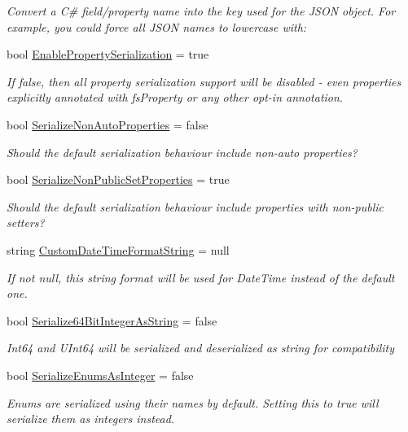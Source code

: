 \begin{DoxyCompactItemize}
\begin{DoxyCompactList}\small\item\em Convert a C\# field/property name into the key used for the J\+S\+ON object. For example, you could force all J\+S\+ON names to lowercase with\+: \end{DoxyCompactList}\item 
bool \hyperlink{class_full_serializer_1_1fs_config_a27026d7a85a80b1512249b1a82f23f84}{Enable\+Property\+Serialization} = true
\begin{DoxyCompactList}\small\item\em If false, then {\itshape all} property serialization support will be disabled -\/ even properties explicitly annotated with fs\+Property or any other opt-\/in annotation. \end{DoxyCompactList}\item 
bool \hyperlink{class_full_serializer_1_1fs_config_a7ec5433d4b0ded151c6febe5720a434c}{Serialize\+Non\+Auto\+Properties} = false
\begin{DoxyCompactList}\small\item\em Should the default serialization behaviour include non-\/auto properties? \end{DoxyCompactList}\item 
bool \hyperlink{class_full_serializer_1_1fs_config_a2ad13b04c4de865650427884b85b088d}{Serialize\+Non\+Public\+Set\+Properties} = true
\begin{DoxyCompactList}\small\item\em Should the default serialization behaviour include properties with non-\/public setters? \end{DoxyCompactList}\item 
string \hyperlink{class_full_serializer_1_1fs_config_acc1c69dd448abc82e44e583cbccbacb4}{Custom\+Date\+Time\+Format\+String} = null
\begin{DoxyCompactList}\small\item\em If not null, this string format will be used for Date\+Time instead of the default one. \end{DoxyCompactList}\item 
bool \hyperlink{class_full_serializer_1_1fs_config_aa16cb6fa33902995e39ec7de2227bc59}{Serialize64\+Bit\+Integer\+As\+String} = false
\begin{DoxyCompactList}\small\item\em Int64 and U\+Int64 will be serialized and deserialized as string for compatibility \end{DoxyCompactList}\item 
bool \hyperlink{class_full_serializer_1_1fs_config_ab8a128737e284c273b5e0e8826435416}{Serialize\+Enums\+As\+Integer} = false
\begin{DoxyCompactList}\small\item\em Enums are serialized using their names by default. Setting this to true will serialize them as integers instead. \end{DoxyCompactList}\end{DoxyCompactItemize}


